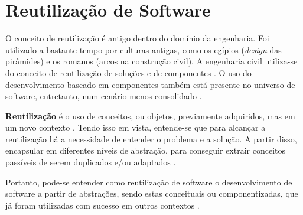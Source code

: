 \section{Reutilização de Software}
O conceito de reutilização é antigo dentro do domínio da engenharia. Foi
utilizado a bastante tempo por culturas antigas, como os egípios
(\textit{design} das pirâmides) e os romanos (arcos na construção civil).
A engenharia civil utiliza-se do conceito de reutilização de soluções e de
componentes \cite{sutcliffe2002}. O uso do desenvolvimento baseado em
componentes também está presente no universo de software, entretanto, num
cenário menos consolidado \cite{sutcliffe2002}.
\par
\indent \textbf{Reutilização} é o uso de conceitos, ou objetos, previamente
adquiridos, mas em um novo contexto \cite{sutcliffe2002}. Tendo isso em vista,
entende-se que para alcançar a reutilização há a necessidade de entender o
problema e a solução. A partir disso, encapsular em diferentes níveis de
abstração, para conseguir extrair conceitos passíveis de serem duplicados e/ou
adaptados \cite{sutcliffe2002}.
\par
\indent Portanto, pode-se entender como reutilização de software o
desenvolvimento de software a partir de abstrações, sendo estas conceituais ou
componentizadas, que já foram utilizadas com sucesso em outros contextos
\cite{sutcliffe2002}.

